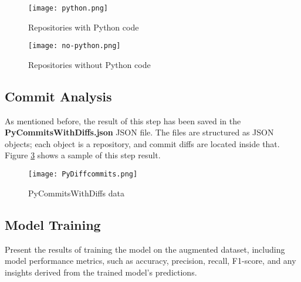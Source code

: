 \begin{figure}
    \centering
    \texttt{[image: python.png]}
    \caption{Repositories with Python code}
    \label{fig:python}
\end{figure}

\begin{figure}
    \centering
    \texttt{[image: no-python.png]}
    \caption{Repositories without Python code}
    \label{fig:no-python}
\end{figure}

\subsection{Commit Analysis}

As mentioned before, the result of this step has been saved in the \textbf{PyCommitsWithDiffs.json} JSON file. 
The files are structured as JSON objects; each object is a repository, and commit diffs are located inside that. Figure \ref{fig:py-diffcommits} shows a sample of this step result.

\begin{figure}
    \centering
    \texttt{[image: PyDiffcommits.png]}
    \caption{PyCommitsWithDiffs data}
    \label{fig:py-diffcommits}
\end{figure}

\subsection{Model Training}

Present the results of training the model on the augmented dataset, including model performance metrics, such as accuracy, precision, recall, F1-score, and any insights derived from the trained model's predictions.

